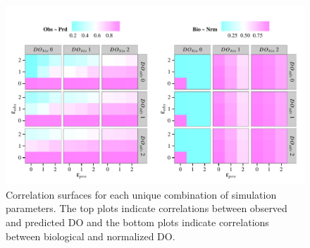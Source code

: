 \documentclass{article}\usepackage{graphicx, color}
\makeatletter
\def\maxwidth{ %
  \ifdim\Gin@nat@width>\linewidth
    \linewidth
  \else
    \Gin@nat@width
  \fi
}
\newenvironment{knitrout}{}{} %
\makeatother
\begin{document}
\begin{knitrout}
\color{fgcolor}\begin{figure}[!h]


{\centering \includegraphics[width=\maxwidth]{figure/cor_surf_act} 

}

\caption[Correlation surfaces for each unique combination of simulation parameters]{Correlation surfaces for each unique combination of simulation parameters.  The top plots indicate correlations between observed and predicted DO and the bottom plots indicate correlations between biological and normalized DO.\label{fig:cor_surf_act}}
\end{figure}


\end{knitrout}

\vfill
\clearpage
\end{document}
